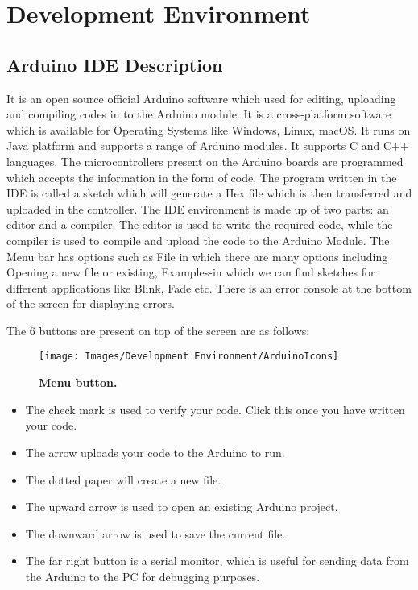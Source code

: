 %
%
%
%

\chapter{Development Environment}
\label{chapter 5}


\section{Arduino IDE Description}\label{ArduinoIDE}

It is an open source official Arduino software which used for editing, uploading and
compiling codes in to the Arduino module. It is a cross-platform software which is
available for Operating Systems like Windows, Linux, macOS. It runs on Java platform
and supports a range of Arduino modules. It supports C and C++ languages. The
microcontrollers present on the Arduino boards are programmed which accepts the
information in the form of code. The program written in the IDE is called a sketch
which will generate a Hex file which is then transferred and uploaded in the controller.
The IDE environment is made up of two parts: an editor and a compiler. The editor
is used to write the required code, while the compiler is used to compile and upload
the code to the Arduino Module.\cite{fezari:2018}
The Menu bar has options such as File in which there are many options including
Opening a new file or existing, Examples-in which we can find sketches for different
applications like Blink, Fade etc. There is an error console at the bottom of the screen
for displaying errors.

The 6 buttons are present on top of the screen are as follows:

\begin{figure}[H]\centering
	\texttt{[image: Images/Development Environment/ArduinoIcons]}
	\caption{\textbf{Menu button.}}
	\label{fig::ArduinoIDEmenubar}		
\end{figure}


\begin{itemize}
	\item	The check mark is used to verify your code. Click this once you have written your code.
	\item	The arrow uploads your code to the Arduino to run.
	\item	The dotted paper will create a new file.
	\item	The upward arrow is used to open an existing Arduino project.
	\item	The downward arrow is used to save the current file.
	\item	The far right button is a serial monitor, which is useful for sending data from the Arduino to the PC for debugging purposes.
\end{itemize}

